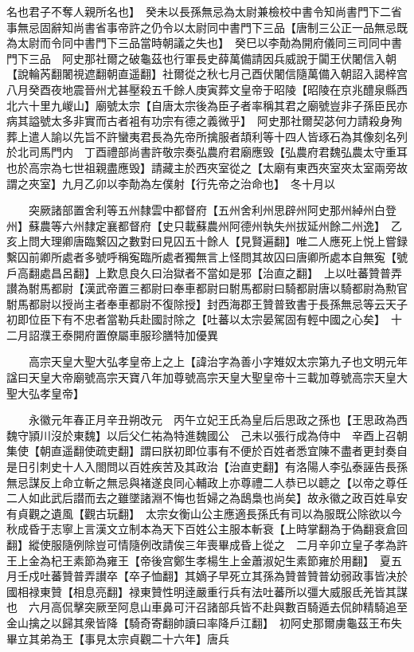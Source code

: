 名也君子不奪人親所名也】　癸未以長孫無忌為太尉兼檢校中書令知尚書門下二省事無忌固辭知尚書省事帝許之仍令以太尉同中書門下三品【唐制三公正一品無忌既為太尉而令同中書門下三品當時朝議之失也】　癸巳以李勣為開府儀同三司同中書門下三品　阿史那社爾之破龜茲也行軍長史薛萬備請因兵威說于闐王伏闍信入朝【說輪芮翻闍視遮翻朝直遥翻】社爾從之秋七月己酉伏闍信隨萬備入朝詔入謁梓宫　八月癸酉夜地震晉州尤甚壓殺五千餘人庚寅葬文皇帝于昭陵【昭陵在京兆醴泉縣西北六十里九嵕山】廟號太宗【自唐太宗後為臣子者率稱其君之廟號豈非子孫臣民亦病其謚號太多非實而古者袓有功宗有德之義微乎】　阿史那社爾契苾何力請殺身殉葬上遣人諭以先旨不許蠻夷君長為先帝所擒服者頡利等十四人皆琢石為其像刻名列於北司馬門内　丁酉禮部尚書許敬宗奏弘農府君廟應毁【弘農府君魏弘農太守重耳也於高宗為七世祖親盡應毁】請藏主於西夾室從之【太廟有東西夾室夾太室兩旁故謂之夾室】九月乙卯以李勣為左僕射【行先帝之治命也】　冬十月以

　　突厥諸部置舍利等五州隸雲中都督府【五州舍利州思辟州阿史那州綽州白登州】蘇農等六州隸定襄都督府【史只載蘇農州阿德州執失州拔延州餘二州逸】　乙亥上問大理卿唐臨繋囚之數對曰見囚五十餘人【見賢遍翻】唯二人應死上悦上嘗録繫囚前卿所處者多號呼稱寃臨所處者獨無言上怪問其故囚曰唐卿所處本自無寃【號戶高翻處昌呂翻】上歎息良久曰治獄者不當如是邪【治直之翻】　上以吐蕃贊普弄讃為駙馬都尉【漢武帝置三都尉曰奉車都尉曰駙馬都尉曰騎都尉唐以騎都尉為勲官駙馬都尉以授尚主者奉車都尉不復除授】封西海郡王贊普致書于長孫無忌等云天子初即位臣下有不忠者當勒兵赴國討除之【吐蕃以太宗晏駕固有輕中國之心矣】　十二月詔濮王泰開府置僚屬車服珍膳特加優異

　　高宗天皇大聖大弘孝皇帝上之上【諱治字為善小字雉奴太宗第九子也文明元年諡曰天皇大帝廟號高宗天寶八年加尊號高宗天皇大聖皇帝十三載加尊號高宗天皇大聖大弘孝皇帝】

　　永徽元年春正月辛丑朔改元　丙午立妃王氏為皇后后思政之孫也【王思政為西魏守頴川沒於東魏】以后父仁祐為特進魏國公　己未以張行成為侍中　辛酉上召朝集使【朝直遥翻使疏吏翻】謂曰朕初即位事有不便於百姓者悉宜陳不盡者更封奏自是日引刺史十人入閤問以百姓疾苦及其政治【治直吏翻】有洛陽人李弘泰誣告長孫無忌謀反上命立斬之無忌與褚遂良同心輔政上亦尊禮二人恭已以聼之【以帝之尊任二人如此武后譛而去之雖墜諸淵不悔也哲婦之為鴟梟也尚矣】故永徽之政百姓阜安有貞觀之遺風【觀古玩翻】　太宗女衡山公主應適長孫氏有司以為服既公除欲以今秋成昏于志寧上言漢文立制本為天下百姓公主服本斬衰【上時掌翻為于偽翻衰倉回翻】縱使服隨例除豈可情隨例改請俟三年喪畢成昏上從之　二月辛卯立皇子孝為許王上金為杞王素節為雍王【帝後宫鄭生孝楊生上金蕭淑妃生素節雍於用翻】　夏五月壬戍吐蕃贊普弄讃卒【卒子恤翻】其嫡子早死立其孫為贊普贊普幼弱政事皆决於國相禄東贊【相息亮翻】禄東贊性明逹嚴重行兵有法吐蕃所以彊大威服氐羌皆其謀也　六月高侃擊突厥至阿息山車鼻可汗召諸部兵皆不赴與數百騎遁去侃帥精騎追至金山擒之以歸其衆皆降【騎奇寄翻帥讀曰率降戶江翻】　初阿史那爾虜龜茲王布失畢立其弟為王【事見太宗貞觀二十六年】唐兵

